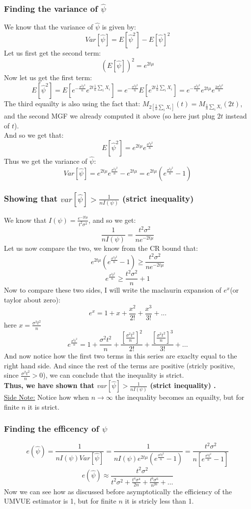 \documentclass[12pt]{article}
\begin{document}
\subsubsection*{Finding the variance of $\hat{\psi}$}
We know that the variance of $\hat{\psi}$ is given by:
\[
Var[\hat{\psi}] = E[\hat{\psi}^2] - E[\hat{\psi}]^2
\]
Let us first get the second term:
\[
(E[\hat{\psi}])^2 = e^{2t\mu}
\]
Now let us get the first term:
\[
E[\hat{\psi}^2] = E[e^{-\frac{\sigma^2t^2}{n}}e^{2t\frac{1}{n}\sum_iX_i}] = e^{-\frac{\sigma^2t^2}{n}}E[e^{2t\frac{1}{n}\sum_iX_i}] = e^{-\frac{\sigma^2t^2}{n}}e^{2t\mu}e^{\frac{2\sigma^2t^2}{n}}
\]
The third equailty is also using the fact that: $M_{2[\frac{1}{n}\sum_iX_i]}(t) = M_{\frac{1}{n}\sum_iX_i}(2t)$, and the second MGF we already computed it above (so here just plug $2t$ instead of $t$). \\
And so we get that:
\[
E[\hat{\psi}^2] = e^{2t\mu}e^{\frac{\sigma^2t^2}{n}}
\]
Thus we get the variance of $\hat{\psi}$:
\[
Var[\hat{\psi}] = e^{2t\mu}e^{\frac{\sigma^2t^2}{n}} - e^{2t\mu} = e^{2t\mu}(e^{\frac{\sigma^2t^2}{n}} - 1)
\]
\subsubsection*{Showing that $var[\hat{\psi}] > \frac{1}{nI(\psi)}$ (strict inequality)}
We know that $I(\psi) = \frac{e^{-2t\mu}}{t^2\sigma^2}$, and so we get:
\[
\frac{1}{nI(\psi)} = \frac{t^2\sigma^2}{ne^{-2t\mu}}
\]
Let us now compare the two, we know from the CR bound that:
\[
e^{2t\mu}(e^{\frac{\sigma^2t^2}{n}} - 1) \geq \frac{t^2\sigma^2}{ne^{-2t\mu}}
\]
\[
  e^{\frac{\sigma^2t^2}{n}} \geq \frac{t^2\sigma^2}{n} +1 
\]
Now to compare these two sides, I will write the maclaurin expansion of $e^x$(or taylor about zero):
\[
e^x = 1 + x + \frac{x^2}{2!} + \frac{x^3}{3!} + ...
\]
here $x = \frac{\sigma^2t^2}{n}$
\[
e^{\frac{\sigma^2t^2}{n}} = 1 + \frac{\sigma^2t^2}{n} + \frac{[\frac{\sigma^2t^2}{n}]^2}{2!} + \frac{[\frac{\sigma^2t^2}{n}]^3}{3!} + ...
\]
And now notice how the first two terms in this series are exaclty equal to the right hand side. And since the rest of the terms are positive (stricly positive, since $\frac{\sigma^2t^2}{n}> 0$), we can conclude that the inequality is strict.  \\ 
\textbf{Thus, we have shown that $var[\hat{\psi}] > \frac{1}{nI(\psi)}$ (strict inequality) .}\\
\underline{Side Note:} Notice how when $n \to \infty$ the inequality becomes an equailty, but for finite $n$ it is strict.
\subsubsection*{Finding the efficency of $\hat{\psi}$}
\[
e(\hat{\psi}) = \frac{1}{nI(\psi)Var[\hat{\psi}]} = \frac{1}{nI(\psi)e^{2t\mu}(e^{\frac{\sigma^2t^2}{n}} - 1)} = \frac{t^2\sigma^2}{n[e^{\frac{\sigma^2t^2}{n}} - 1]}
\]
\[
e(\hat{\psi}) \approx \frac{t^2\sigma^2}{t^2\sigma^2+ \frac{t^4\sigma^4}{2n}+ \frac{t^6\sigma^6}{n^26}+ \dots}
\]
Now we can see how as discussed before asymptotically the efficiency of the UMVUE estimator is 1, but for finite $n$ it is stricly less than 1.
\end{document}
